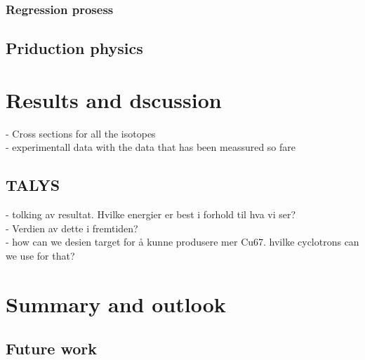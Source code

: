 \documentclass[twoside,english]{uiofysmaster/uiofysmaster}
\begin{document}
\subsection{Regression prosess}


\section{Priduction physics}
\label{sec: prod_physics}




\chapter{Results and dscussion} 
\label{ch: res_and_discussion}
- Cross sections for all the isotopes\\
- experimentall data with the data that has been meassured so fare


\section{TALYS}
\label{sec: talys}


- tolking av resultat. Hvilke energier er best i forhold til hva vi ser?\\
- Verdien av dette i fremtiden?\\
- how can we  desien target for å kunne produsere mer Cu67. hvilke cyclotrons can we use for that? 








\chapter{Summary and outlook}
\label{sum_and_outlook}
\citep{Prasad1971a}
\section{Future work}
\label{sec: future_work}
\end{document}
